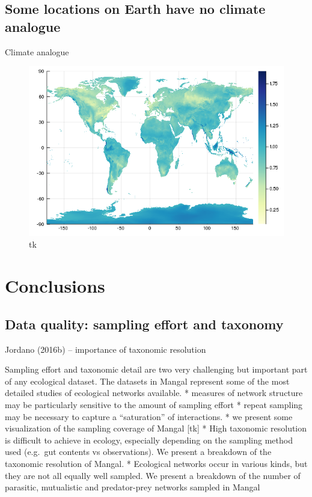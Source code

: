 \hypertarget{some-locations-on-earth-have-no-climate-analogue}{%
\subsection{Some locations on Earth have no climate
analogue}\label{some-locations-on-earth-have-no-climate-analogue}}

Climate analogue

\begin{figure}
\centering
\includegraphics{figures/figure_03_b.png}
\caption{tk\label{fig:analog}}
\end{figure}

\hypertarget{conclusions}{%
\section{Conclusions}\label{conclusions}}

\hypertarget{data-quality-sampling-effort-and-taxonomy}{%
\subsection{Data quality: sampling effort and
taxonomy}\label{data-quality-sampling-effort-and-taxonomy}}

Jordano (2016b) -- importance of taxonomic resolution

Sampling effort and taxonomic detail are two very challenging but
important part of any ecological dataset. The datasets in Mangal
represent some of the most detailed studies of ecological networks
available. * measures of network structure may be particularly sensitive
to the amount of sampling effort * repeat sampling may be necessary to
capture a ``saturation'' of interactions. * we present some
visualization of the sampling coverage of Mangal {[}tk{]} * High
taxonomic resolution is difficult to achieve in ecology, especially
depending on the sampling method used (e.g.~gut contents vs
observations). We present a breakdown of the taxonomic resolution of
Mangal. * Ecological networks occur in various kinds, but they are not
all equally well sampled. We present a breakdown of the number of
parasitic, mutualistic and predator-prey networks sampled in Mangal

